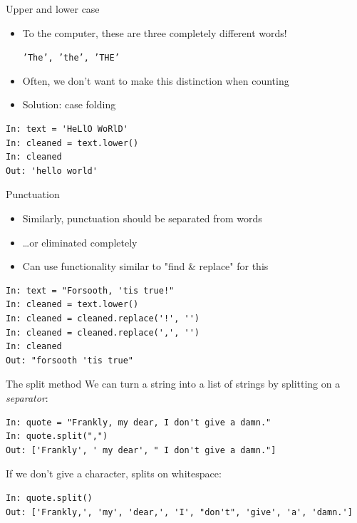 \documentclass[aspectratio=169,usenames,dvipsnames]{beamer}
\begin{document}
\begin{frame}[fragile]{Upper and lower case}
    \begin{itemize}
        \item To the computer, these
            are three completely different words!

            \texttt{'The', 'the', 'THE'}
        \item Often, we don't want to make this distinction when counting
        \item Solution: case folding
    \end{itemize}
    \pause
\begin{lstlisting}
In: text = 'HeLlO WoRlD'
In: cleaned = text.lower()
In: cleaned
Out: 'hello world'
\end{lstlisting}
\end{frame}

\begin{frame}[fragile]{Punctuation}
    \begin{itemize}
        \item Similarly, punctuation should be separated from words
        \item \dots or eliminated completely
        \item Can use functionality similar to "find \& replace" for this
    \end{itemize}
    \pause
\begin{lstlisting}
In: text = "Forsooth, 'tis true!"
In: cleaned = text.lower()
In: cleaned = cleaned.replace('!', '')
In: cleaned = cleaned.replace(',', '')
In: cleaned
Out: "forsooth 'tis true"
\end{lstlisting}
\end{frame}

\begin{frame}[fragile]{The split method}
We can turn a string into a list of strings
by splitting on a \emph{separator}:
\begin{lstlisting}
In: quote = "Frankly, my dear, I don't give a damn."
In: quote.split(",")
Out: ['Frankly', ' my dear', " I don't give a damn."]
\end{lstlisting}

\pause
If we don't give a character, splits on whitespace:
\begin{lstlisting}
In: quote.split()
Out: ['Frankly,', 'my', 'dear,', 'I', "don't", 'give', 'a', 'damn.']
\end{lstlisting}
\end{frame}
\end{document}
